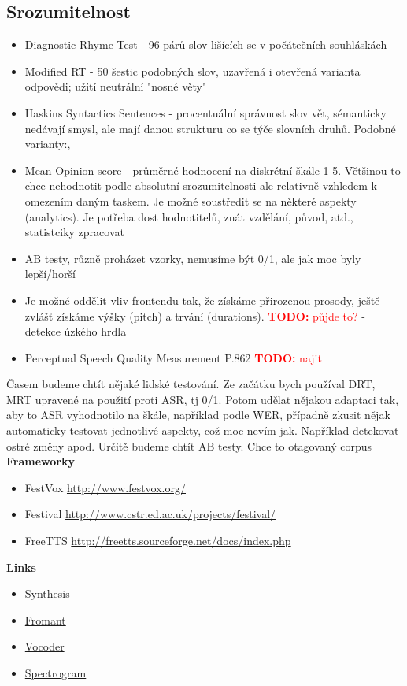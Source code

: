 \documentclass{article}
\newcommand{\sect}[1]{\LARGE\textbf{{#1}}\normalsize}
\newcommand{\td}[1]{\textcolor{red}{\textbf{TODO:} #1}}
\newcommand{\note}[1]{\textcolor{notegreen}{#1}}
\begin{document}
\subsection*{Srozumitelnost}
\begin{itemize}
\item Diagnostic Rhyme Test - 96 párů slov lišících se v počátečních souhláskách
\item Modified RT - 50 šestic podobných slov, uzavřená i otevřená varianta odpovědi; užití neutrální "nosné věty"
\item Haskins Syntactics Sentences\cite{egan1948test} - procentuální správnost slov vět, sémanticky nedávají smysl, ale mají danou strukturu co se týče slovních druhů. Podobné varianty:\cite{nye74test},\cite{howard92test}
\item Mean Opinion score - průměrné hodnocení na diskrétní škále 1-5. Většinou to chce nehodnotit podle absolutní srozumitelnosti ale relativně vzhledem k omezením daným taskem. Je možné soustředit se na některé aspekty (analytics). Je potřeba dost hodnotitelů, znát vzdělání, původ, atd., statistciky zpracovat
\item AB testy, různě proházet vzorky, nemusíme být 0/1, ale jak moc byly lepší/horší
\item Je možné oddělit vliv frontendu tak, že získáme přirozenou prosody, ještě zvlášť získáme výšky (pitch) a trvání (durations). \td{půjde to?} - detekce úzkého hrdla
\item Perceptual Speech Quality Measurement P.862 \td{najit}
\end{itemize}
\note{Časem budeme chtít nějaké lidské testování. Ze začátku bych používal DRT, MRT upravené na použití proti ASR, tj 0/1. Potom udělat nějakou adaptaci tak, aby to ASR vyhodnotilo na škále, například podle WER, případně zkusit nějak automaticky testovat jednotlivé aspekty, což moc nevím jak. Například detekovat ostré změny apod. Určitě budeme chtít AB testy. Chce to otagovaný corpus}
\\
\sect{Frameworky}
\begin{itemize}
\item FestVox \url{http://www.festvox.org/}
\item Festival \url{http://www.cstr.ed.ac.uk/projects/festival/}
\item FreeTTS \url{http://freetts.sourceforge.net/docs/index.php}
\end{itemize}
\sect{Links}
\begin{itemize}
\item\href{https://en.wikipedia.org/wiki/Speech_synthesis}{Synthesis}
\item\href{https://en.wikipedia.org/wiki/Formant}{Fromant}
\item\href{https://en.wikipedia.org/wiki/Vocoder}{Vocoder}
\item\href{https://en.wikipedia.org/wiki/Spectrogram}{Spectrogram}
\end{itemize}


\end{document}
